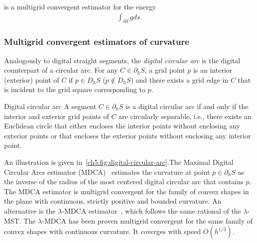is a multigrid convergent estimator for the energy~\cite{lachaud06hdr}
\begin{align*}
	\int_{\partial S}{ g ds }.
\end{align*}



\subsubsection{Multigrid convergent estimators of curvature}

Analogously to digital straight segments, the \emph{digital circular arc} is the digital counterpart of a circular arc. For any $C \in \partial_h S$, a grid point $p$ is an interior (exterior) point of $C$ if $p \in D_h S$ ($p \notin D_h S$) and there exists a grid edge in $C$ that is incident to the grid square corresponding to $p$.

\begin{definition}{Digital circular arc} 
A segment $C \in \partial_h S$ is a digital circular arc if and only if the interior and exterior grid points of $C$ are circularly separable, i.e., there exists an Euclidean circle that either encloses the interior points without enclosing any exterior points or that encloses the exterior points without enclosing any interior point.
\end{definition}

An illustration is given in~\cref{ch5:fig:digital-circular-arc}.The Maximal Digital Circular Arcs estimator (MDCA)~\cite{roussillon11mdca} estimates the curvature at point $p \in \partial_h S$ as the inverse of the radius of the most centered digital circular arc that contains $p$. The MDCA estimator is multigrid convergent for the family of convex shapes in the plane with continuous, strictly positive and bounded curvature. An alternative is the $\lambda$-MDCA estimator~\cite{schindele17mdca}, which follows the same rational of the $\lambda$-MST. The $\lambda$-MDCA has been proven multigrid convergent for the same family of convex shapes with continuous curvature. It coverges with speed $O(h^{1/3})$.



